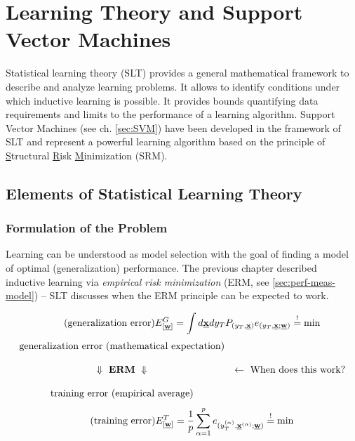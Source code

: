 
\newpage
\section{Learning Theory and Support Vector Machines}
\label{sec:learn-theory-supp}
\setcounter{equation}{0}

Statistical learning theory (SLT) provides a general mathematical
framework to describe and analyze learning problems. It allows to
identify conditions under which inductive learning is possible. It
provides bounds quantifying data requirements and limits to the
performance of a learning algorithm. Support Vector Machines (see
ch. \ref{sec:SVM}) have been developed in the framework of SLT and
represent a powerful learning algorithm based on the principle of
\underline{S}tructural \underline{R}isk \underline{M}inimization
(SRM).

\subsection{Elements of Statistical Learning Theory}

\subsubsection{Formulation of the Problem}
Learning can be understood as model selection with the goal of finding
a model of optimal (generalization) performance. The previous chapter described
inductive learning via \emph{empirical risk minimization} (ERM, see
\ref{sec:perf-meas-model}) -- SLT discusses when the ERM principle can
be expected to work. 

\begin{equation} \tag{generalization error}
	E_{[\underline{\mathbf{w}}]}^G = \int d \underline{\mathbf{x}} d y_T P_{(y_T, \underline{\mathbf{x}})}
		e_{(y_T, \underline{\mathbf{x}};\underline{\mathbf{w}})} \stackrel{\mathrm{!}}{=} \min
\end{equation}
\[ \begin{array}{cl}
	\text{generalization error (mathematical expectation)} \\ \\
	\Downarrow \text{ \textbf{ERM} } \Downarrow 
		& \leftarrow \text{ When does this work?} \\\\
	\text{training error (empirical average)}
\end{array} \]
\begin{equation} \tag{training error}
	E_{[\underline{\mathbf{w}}]}^T = \frac{1}{p} \sum_{\alpha = 1}^p 
		e_{(y_T^{(\alpha)}, \underline{\mathbf{x}}^{(\alpha)}; \underline{\mathbf{w}})} \stackrel{\mathrm{!}}{=} \min
\end{equation}

